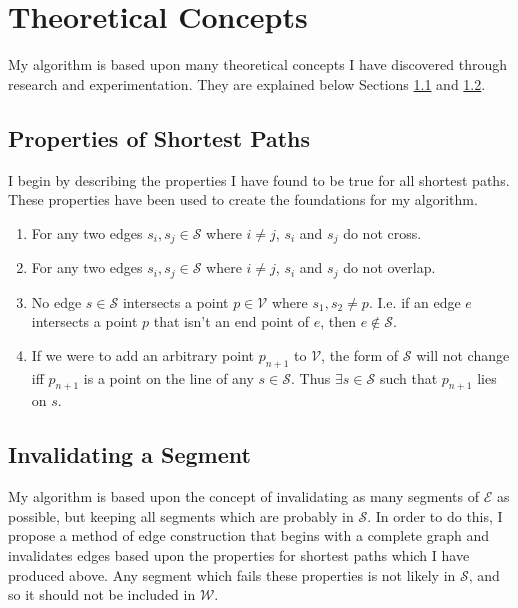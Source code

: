 \documentclass[12pt]{article}
\begin{document}
\section{Theoretical Concepts}\label{sec:theory}
My algorithm is based upon many theoretical concepts I have discovered through
research and experimentation. They are explained below
Sections \ref{subsec:props} and \ref{subsec:invalid}.

\subsection{Properties of Shortest Paths}\label{subsec:props}
I begin by describing the properties I have found to be true for all shortest
paths. These properties have been used to create the foundations for my algorithm.
\begin{enumerate}
\item For any two edges $s_i,s_j \in \mathcal{S}$ where
$i \neq j$, $s_i$ and $s_j$ do not cross. 
\item For any two edges $s_i,s_j \in \mathcal{S}$ where
$i \neq j$, $s_i$ and $s_j$ do not overlap. 
\item No edge $s \in \mathcal{S}$ intersects a point
$p \in \mathcal{V}$ where $s_1,s_2 \neq p$.
I.e. if an edge $e$ intersects a point $p$ that isn't an end point of $e$,
then $e \notin \mathcal{S}$.
\item If we were to add an arbitrary point $p_{n+1}$ to $\mathcal{V}$,
the form of $\mathcal{S}$
will not change iff $p_{n+1}$ is a point on the line of any $s \in \mathcal{S}$.
Thus $\exists s \in \mathcal{S}$ such that $p_{n+1}$ lies on $s$.
\end{enumerate}

\subsection{Invalidating a Segment}\label{subsec:invalid}
My algorithm is based upon the concept of invalidating as many segments of $\mathcal{E}$
as possible, but keeping all segments which are probably in $\mathcal{S}$.
In order to do this,
I propose a method of edge construction that begins with a complete graph
and invalidates edges based upon the
properties for shortest paths which I have produced
above. Any segment which fails these properties is not likely in $\mathcal{S}$,
and so it should not be included in $\mathcal{W}$.
\end{document}
